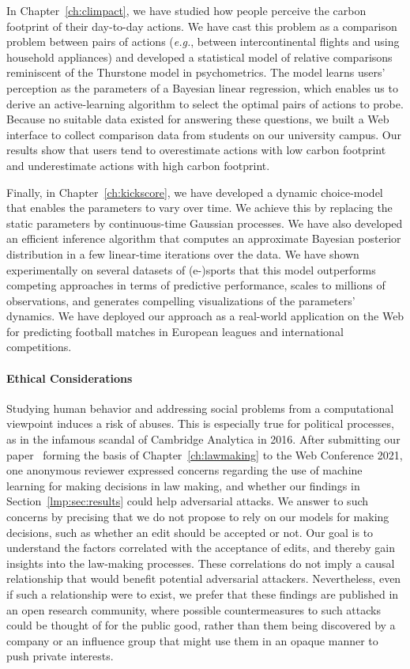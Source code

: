 In Chapter~\ref{ch:climpact}, we have studied how people perceive the carbon footprint of their day-to-day actions.
We have cast this problem as a comparison problem between pairs of actions (\textit{e.g.}, between intercontinental flights and using household appliances) and developed a statistical model of relative comparisons reminiscent of the Thurstone model in psychometrics.
The model learns users' perception as the parameters of a Bayesian linear regression, which enables us to derive an active-learning algorithm to select the optimal pairs of actions to probe.
Because no suitable data existed for answering these questions, we built a Web interface to collect comparison data from students on our university campus.
Our results show that users tend to overestimate actions with low carbon footprint and underestimate actions with high carbon footprint.

Finally, in Chapter~\ref{ch:kickscore}, we have developed a dynamic choice-model that enables the parameters to vary over time.
We achieve this by replacing the static parameters by continuous-time Gaussian processes.
We have also developed an efficient inference algorithm that computes an approximate Bayesian posterior distribution in a few linear-time iterations over the data.
We have shown experimentally on several datasets of (e-)sports that this model outperforms competing approaches in terms of predictive performance, scales to millions of observations, and generates compelling visualizations of the parameters' dynamics.
We have deployed our approach as a real-world application on the Web for predicting football matches in European leagues and international competitions.

\paragraph{Ethical Considerations}
Studying human behavior and addressing social problems from a computational viewpoint induces a risk of abuses.
This is especially true for political processes, as in the infamous scandal of Cambridge Analytica in 2016.
After submitting our paper~\citep{kristof2021war} forming the basis of Chapter~\ref{ch:lawmaking} to the Web Conference 2021, one anonymous reviewer expressed concerns regarding the use of machine learning for making decisions in law making, and whether our findings in Section~\ref{lmp:sec:results} could help adversarial attacks.
We answer to such concerns by precising that we do not propose to rely on our models for making decisions, such as whether an edit should be accepted or not.
Our goal is to understand the factors correlated with the acceptance of edits, and thereby gain insights into the law-making processes.
These correlations do not imply a causal relationship that would benefit potential adversarial attackers.
Nevertheless, even if such a relationship were to exist, we prefer that these findings are published in an open research community, where possible countermeasures to such attacks could be thought of for the public good, rather than them being discovered by a company or an influence group that might use them in an opaque manner to push private interests.

